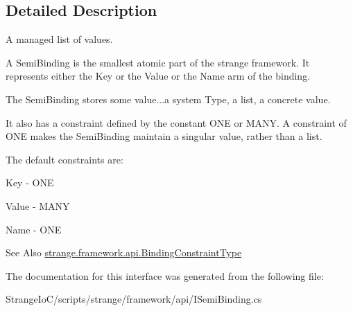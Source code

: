 \subsection{Detailed Description}
A managed list of values. 

A Semi\-Binding is the smallest atomic part of the strange framework. It represents either the Key or the Value or the Name arm of the binding. \par
 The Semi\-Binding stores some value...a system Type, a list, a concrete value. \par
 It also has a constraint defined by the constant O\-N\-E or M\-A\-N\-Y. A constraint of O\-N\-E makes the Semi\-Binding maintain a singular value, rather than a list. \par
 The default constraints are\-: 
\begin{DoxyItemize}
\item Key -\/ O\-N\-E 
\item Value -\/ M\-A\-N\-Y 
\item Name -\/ O\-N\-E 
\end{DoxyItemize}

\begin{DoxySeeAlso}{See Also}
\hyperlink{namespacestrange_1_1framework_1_1api_a9819c5ab6d03a2cbce2d3dddf5264e42}{strange.\-framework.\-api.\-Binding\-Constraint\-Type} 
\end{DoxySeeAlso}


The documentation for this interface was generated from the following file\-:\begin{DoxyCompactItemize}
\item 
Strange\-Io\-C/scripts/strange/framework/api/I\-Semi\-Binding.\-cs\end{DoxyCompactItemize}
